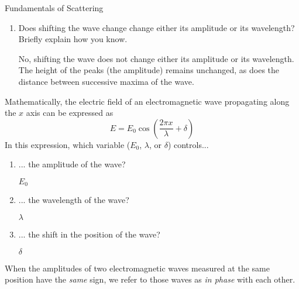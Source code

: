 \begin{activity}{Fundamentals of Scattering}
\begin{ctqs}
\begin{enumerate}
			\item Does shifting the wave change change either its amplitude or its wavelength?  Briefly explain how you know.
			
				\begin{solution}[1.5in]{}
					No, shifting the wave does not change either its amplitude or its wavelength.  The height of the peaks (the amplitude) remains unchanged, as does the distance between successive maxima of the wave.
				\end{solution}
				
		\end{enumerate}

	\question Mathematically, the electric field of an electromagnetic wave propagating along the $x$ axis can be expressed as
	\begin{equation*}
		E = E_0 \cos\left( \frac{2\pi x}{\lambda} + \delta \right)
	\end{equation*}
	In this expression, which variable ($E_0$, $\lambda$, or $\delta$) controls...
	
		\begin{enumerate}
		
			\item ... the amplitude of the wave?
			
				\begin{solution}[0.25in]{}
					$E_0$
				\end{solution}
			
			\item ... the wavelength of the wave?
			
				\begin{solution}[0.25in]{}
					$\lambda$
				\end{solution}
			
			\item ... the shift in the position of the wave?
			
				\begin{solution}[0.25in]{}
					$\delta$
				\end{solution}
		
		\end{enumerate}
		
\end{ctqs}

\begin{infobox}
	When the amplitudes of two electromagnetic waves measured at the same position have the \emph{same} sign, we refer to those waves as \emph{in phase} with each other.
	

\end{infobox}
\end{activity}
